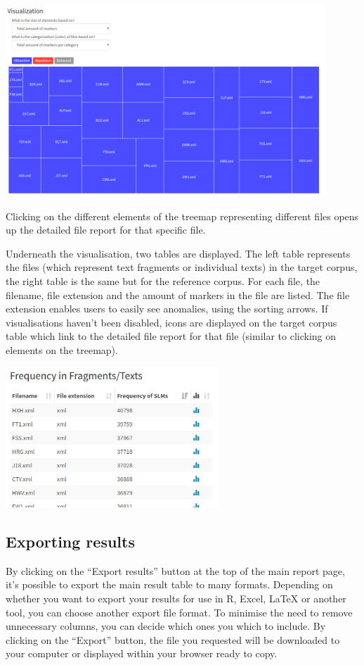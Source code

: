 \documentclass[11pt,a4paper]{article}
\begin{document}
\centerline{\includegraphics[width=0.9\textwidth]{images/treemap.png}}

Clicking on the different elements of the treemap representing different files opens up the detailed file report for that specific file.

Underneath the visualisation, two tables are displayed. The left table represents the files (which represent text fragments or individual texts) in the target corpus, the right table is the same but for the reference corpus. For each file, the filename, file extension and the amount of markers in the file are listed. The file extension enables users to easily see anomalies, using the sorting arrows. If visualisations haven't been disabled, icons are displayed on the target corpus table which link to the detailed file report for that file (similar to clicking on elements on the treemap).

\centerline{\includegraphics[width=0.6\textwidth]{images/mainreport_frac.png}}

\subsection{Exporting results}

By clicking on the ``Export results'' button at the top of the main report page, it's possible to export the main result table to many formats. Depending on whether you want to export your results for use in R, Excel, LaTeX or another tool, you can choose another export file format. To minimise the need to remove unnecessary columns, you can decide which ones you which to include. By clicking on the ``Export'' button, the file you requested will be downloaded to your computer or displayed within your browser ready to copy.
\end{document}
